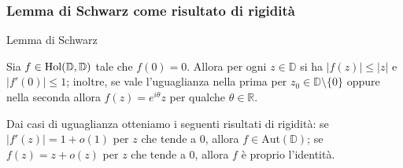\begin{frame}
  \frametitle{Lemma di Schwarz come risultato di rigidità}
  \begin{block}{Lemma di Schwarz}
    \begin{itshape}
      Sia $f \in \text{\normalfont{Hol}}(\mathbb{D},\mathbb{D})$ tale che $f(0)=0$. Allora per ogni $z \in \mathbb{D}$ si ha $|f(z)| \le |z|$ e $|f'(0)| \le 1$; inoltre, se vale l'uguaglianza nella prima per $z_0 \in \mathbb{D}\setminus\{0\}$ oppure nella seconda allora $f(z)=e^{i\theta}z$ per qualche $\theta \in \mathbb{R}$.
    \end{itshape}
  \end{block}
  \pause
  \begin{oss}
    Dai casi di uguaglianza otteniamo i seguenti risultati di rigidità: se $|f'(z)|=1+o(1)$ per $z$ che tende a $0$, allora $f \in \text{Aut}(\mathbb{D})$; se $f(z)=z+o(z)$ per $z$ che tende a $0$, allora $f$ è proprio l'identità.
  \end{oss}
\end{frame}

